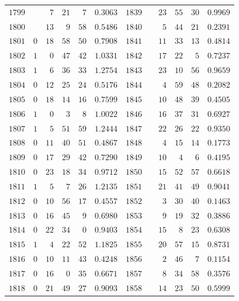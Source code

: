 \begin{lrbox}{\GaussVIEpochFrameBox}
\begin{minipage}{\dimexpr\linewidth-20pt\relax}
\begin{tabular}{r|rrrr|r||r|rrrr|r}
$1799$ &  & $7$ & $21$ & $7$ & $0.3063$ & $1839$ &  & $23$ & $55$ & $30$ & $0.9969$\\
$1800$ &  & $13$ & $9$ & $58$ & $0.5486$ & $1840$ &  & $5$ & $44$ & $21$ & $0.2391$\\[3pt]
$1801$ & $0$ & $18$ & $58$ & $50$ & $0.7908$ & $1841$ &  & $11$ & $33$ & $13$ & $0.4814$\\
$1802$ & $1$ & $0$ & $47$ & $42$ & $1.0331$ & $1842$ &  & $17$ & $22$ & $5$ & $0.7237$\\
$1803$ & $1$ & $6$ & $36$ & $33$ & $1.2754$ & $1843$ &  & $23$ & $10$ & $56$ & $0.9659$\\
$1804$ & $0$ & $12$ & $25$ & $24$ & $0.5176$ & $1844$ &  & $4$ & $59$ & $48$ & $0.2082$\\
$1805$ & $0$ & $18$ & $14$ & $16$ & $0.7599$ & $1845$ &  & $10$ & $48$ & $39$ & $0.4505$\\[3pt]
$1806$ & $1$ & $0$ & $3$ & $8$ & $1.0022$ & $1846$ &  & $16$ & $37$ & $31$ & $0.6927$\\
$1807$ & $1$ & $5$ & $51$ & $59$ & $1.2444$ & $1847$ &  & $22$ & $26$ & $22$ & $0.9350$\\
$1808$ & $0$ & $11$ & $40$ & $51$ & $0.4867$ & $1848$ &  & $4$ & $15$ & $14$ & $0.1773$\\
$1809$ & $0$ & $17$ & $29$ & $42$ & $0.7290$ & $1849$ &  & $10$ & $4$ & $6$ & $0.4195$\\
$1810$ & $0$ & $23$ & $18$ & $34$ & $0.9712$ & $1850$ &  & $15$ & $52$ & $57$ & $0.6618$\\[3pt]
$1811$ & $1$ & $5$ & $7$ & $26$ & $1.2135$ & $1851$ &  & $21$ & $41$ & $49$ & $0.9041$\\
$1812$ & $0$ & $10$ & $56$ & $17$ & $0.4557$ & $1852$ &  & $3$ & $30$ & $40$ & $0.1463$\\
$1813$ & $0$ & $16$ & $45$ & $9$ & $0.6980$ & $1853$ &  & $9$ & $19$ & $32$ & $0.3886$\\
$1814$ & $0$ & $22$ & $34$ & $0$ & $0.9403$ & $1854$ &  & $15$ & $8$ & $23$ & $0.6308$\\
$1815$ & $1$ & $4$ & $22$ & $52$ & $1.1825$ & $1855$ &  & $20$ & $57$ & $15$ & $0.8731$\\[3pt]
$1816$ & $0$ & $10$ & $11$ & $43$ & $0.4248$ & $1856$ &  & $2$ & $46$ & $7$ & $0.1154$\\
$1817$ & $0$ & $16$ & $0$ & $35$ & $0.6671$ & $1857$ &  & $8$ & $34$ & $58$ & $0.3576$\\
$1818$ & $0$ & $21$ & $49$ & $27$ & $0.9093$ & $1858$ &  & $14$ & $23$ & $50$ & $0.5999$\\

\end{tabular}
\end{minipage}
\end{lrbox}
